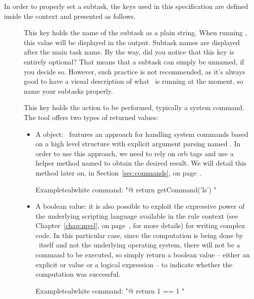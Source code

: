 \begin{description}
In order to properly set a subtask, the keys used in this specification are defined inside the  context and presented as follows.

\begin{description}
\item[] This key holds the name of the subtask as a plain string. When running \arara, this value will be displayed in the output. Subtask names are displayed after the main task name. By the way, did you notice that this key is entirely optional? That means that a subtask can simply be unnamed, if you decide so. However, such practice is not recommended, as it's always good to have a visual description of what \arara\ is running at the moment, so name your subtasks properly.

\item[] This key holds the action to be performed, typically a system command. The tool offers two types of returned values:

\begin{itemize}[label={--}]
\item A  object: \arara\ features an approach for handling system commands based on a high level structure with explicit argument parsing named . In order to use this approach, we need to rely on orb tags and use a helper method named  to obtain the desired result. We will detail this method later on, in Section~\ref{sec:commands}, on page~\pageref{sec:commands}.

\begin{codebox}{Example}{teal}{\icnote}{white}
command: "@{ return getCommand('ls') }"
\end{codebox}

\item A boolean value: it is also possible to exploit the expressive power of the underlying scripting language available in the rule context (see Chapter~\ref{chap:mvel}, on page~\pageref{chap:mvel}, for more details) for writing complex code. In this particular case, since the computation is being done by \arara\ itself and not the underlying operating system, there will not be a command to be executed, so simply return a boolean value -- either an explicit  or  value or a logical expression -- to indicate whether the computation was successful.

\begin{codebox}{Example}{teal}{\icnote}{white}
command: "@{ return 1 == 1 }"
\end{codebox}
\end{itemize}


\end{description}
\end{description}
